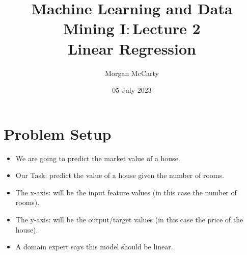 \documentclass[12pt]{article}
\title{
    Machine Learning and Data Mining I$\colon$Lecture 2\\
    Linear Regression
}
\author{Morgan McCarty}
\date{05 July 2023}
\begin{document}
    \maketitle
    \section{Problem Setup}
        \begin{itemize}
            \item We are going to predict the market value of a house.
            \item Our Task: predict the value of a house given the number of rooms.
            \item The x-axis: will be the input feature values (in this case the number of rooms).
            \item The y-axis: will be the output/target values (in this case the price of the house).
            \item A domain expert says this model should be linear.
        \end{itemize}
\end{document}

